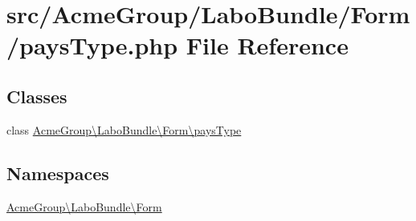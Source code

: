 \hypertarget{pays_type_8php}{\section{src/\+Acme\+Group/\+Labo\+Bundle/\+Form/pays\+Type.php File Reference}
\label{pays_type_8php}
}
\subsection*{Classes}
\begin{DoxyCompactItemize}
\item 
class \hyperlink{class_acme_group_1_1_labo_bundle_1_1_form_1_1pays_type}{Acme\+Group\textbackslash{}\+Labo\+Bundle\textbackslash{}\+Form\textbackslash{}pays\+Type}
\end{DoxyCompactItemize}
\subsection*{Namespaces}
\begin{DoxyCompactItemize}
\item 
 \hyperlink{namespace_acme_group_1_1_labo_bundle_1_1_form}{Acme\+Group\textbackslash{}\+Labo\+Bundle\textbackslash{}\+Form}
\end{DoxyCompactItemize}
